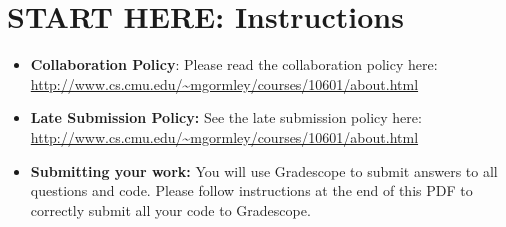 \documentclass[11pt,addpoints,answers]{exam}
\begin{document}
\section*{START HERE: Instructions}
\begin{itemize}

\item \textbf{Collaboration Policy}: Please read the collaboration policy here: \url{http://www.cs.cmu.edu/~mgormley/courses/10601/about.html}

\item\textbf{Late Submission Policy:} See the late submission policy here: \url{http://www.cs.cmu.edu/~mgormley/courses/10601/about.html}

\item\textbf{Submitting your work:} You will use Gradescope to submit
  answers to all questions and code. Please
  follow instructions at the end of this PDF to correctly submit all your code to Gradescope.

  \begin{itemize}
    
\begin{comment}
  \item \textbf{Canvas:} Canvas (\url{https://canvas.cmu.edu}) will be
    used for quiz-style problems (e.g. multiple choice, true / false,
    numerical answers). Grading is done automatically.
    You may only \textbf{submit once} on canvas, so be sure of your
    answers before you submit. However, canvas allows you to work on
    your answers and then close out of the page and it will save your
    progress.  You will not be granted additional submissions, so
    please be confident of your solutions when you are submitting your
    assignment.
    {\color{red} The above is true for future assignments, but this one
    allows {\bf unlimited submissions}.}
\end{comment}
    
  \begin{comment}
   \item \textbf{Gradescope:} For written problems such as derivations,
       proofs, or plots we will be using Gradescope
       (\url{https://gradescope.com/}). Submissions can be handwritten, but
       should be labeled and clearly legible. If your writing is not
       legible, you will not be awarded marks. Alternatively, submissions
       can be written in LaTeX. Upon submission, label each question
       using the template provided. Regrade requests can be made, however
       this gives the TA the opportunity to regrade your entire paper,
       meaning if additional mistakes are found then points will be
       deducted.
       Each derivation/proof should be  completed on a separate page.


\end{comment}
\end{itemize}
\end{itemize}
\end{document}
